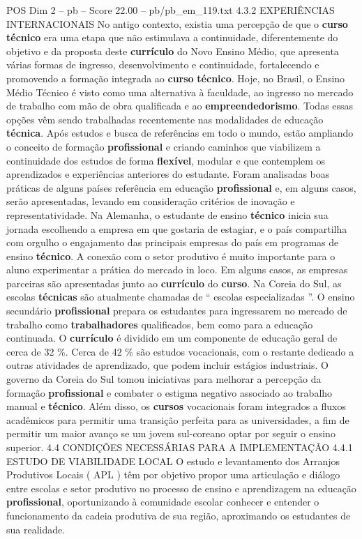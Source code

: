 \begin{textsample}{POS Dim 2 – pb – Score 22.00 – pb/pb\_em\_119.txt}  \label{ex:f2_pos_274}
4.3.2 EXPERIÊNCIAS INTERNACIONAIS No antigo contexto, existia uma percepção de que o \textbf{curso} \textbf{técnico} era uma etapa que não estimulava a continuidade, diferentemente do objetivo e da proposta deste \textbf{currículo} do Novo Ensino Médio, que apresenta várias formas de ingresso, desenvolvimento e continuidade, fortalecendo e promovendo a formação integrada ao \textbf{curso} \textbf{técnico}.
Hoje, no Brasil, o Ensino Médio Técnico é visto como uma alternativa à faculdade, ao ingresso no mercado de trabalho com mão de obra qualificada e ao \textbf{empreendedorismo}.
Todas essas opções vêm sendo trabalhadas recentemente nas modalidades de educação \textbf{técnica}.
Após estudos e busca de referências em todo o mundo, estão ampliando o conceito de formação \textbf{profissional} e criando caminhos que viabilizem a continuidade dos estudos de forma \textbf{flexível}, modular e que contemplem os aprendizados e experiências anteriores do estudante.
Foram analisadas boas práticas de alguns países referência em educação \textbf{profissional} e, em alguns casos, serão apresentadas, levando em consideração critérios de inovação e representatividade.
Na Alemanha, o estudante de ensino \textbf{técnico} inicia sua jornada escolhendo a empresa em que gostaria de estagiar, e o país compartilha com orgulho o engajamento das principais empresas do país em programas de ensino \textbf{técnico}.
A conexão com o setor produtivo é muito importante para o aluno experimentar a prática do mercado in loco.
Em alguns casos, as empresas parceiras são apresentadas junto ao \textbf{currículo} do \textbf{curso}.
Na Coreia do Sul, as escolas \textbf{técnicas} são atualmente chamadas de “ escolas especializadas ”.
O ensino secundário \textbf{profissional} prepara os estudantes para ingressarem no mercado de trabalho como \textbf{trabalhadores} qualificados, bem como para a educação continuada.
O \textbf{currículo} é dividido em um componente de educação geral de cerca de 32 \%.
Cerca de 42 \% são estudos vocacionais, com o restante dedicado a outras atividades de aprendizado, que podem incluir estágios industriais.
O governo da Coreia do Sul tomou iniciativas para melhorar a percepção da formação \textbf{profissional} e combater o estigma negativo associado ao trabalho manual e \textbf{técnico}.
Além disso, os \textbf{cursos} vocacionais foram integrados a fluxos acadêmicos para permitir uma transição perfeita para as universidades, a fim de permitir um maior avanço se um jovem sul-coreano optar por seguir o ensino superior. 4.4 CONDIÇÕES NECESSÁRIAS PARA A IMPLEMENTAÇÃO 4.4.1 ESTUDO DE VIABILIDADE LOCAL O estudo e levantamento dos Arranjos Produtivos Locais ( APL ) têm por objetivo propor uma articulação e diálogo entre escolas e setor produtivo no processo de ensino e aprendizagem na educação \textbf{profissional}, oportunizando à comunidade escolar conhecer e entender o funcionamento da cadeia produtiva de sua região, aproximando os estudantes de sua realidade.

\end{textsample}
